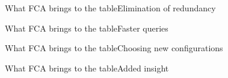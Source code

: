 \begin{frame}{What FCA brings to the table}{Elimination of redundancy}
\end{frame}

\begin{frame}{What FCA brings to the table}{Faster queries}
\end{frame}

\begin{frame}{What FCA brings to the table}{Choosing new configurations}
\end{frame}

\begin{frame}{What FCA brings to the table}{Added insight}
\end{frame}